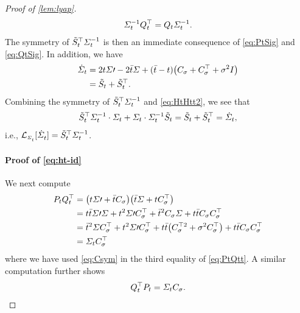 \begin{proof}[Proof of \cref{lem:lyap}]
\begin{align}
\label{eq:QtSig}
\Sigma^{-1}_{t}Q_{t}^\top = Q_{t} \Sigma^{-1}_{t}.
\end{align}The symmetry of $\tilde{S}_{t}^\top\Sigma^{-1}_{t}$ is then an immediate consequence of \eqref{eq:PtSig} and \eqref{eq:QtSig}. In addition, we have
\begin{align}
\nn
\dSigcurve &= 2\ctime\Sigma\prime - 2 \ctimebar\Sigma + (\ctimebar-\ctime)\parens*{   \C +\C^\top  + \sdev^2\eye } \\
\label{eq:HtHtt2}
&=  \Ht + \Ht^\top.
\end{align}
Combining the symmetry of $\tilde{S}_{t}^\top\Sigma^{-1}_{t}$ and \eqref{eq:HtHtt2}, we see that
\begin{align}
\nonumber
\tilde{S}_{t}^\top\Sigma^{-1}_{t} \cdot \Sigma_{t} + \Sigma_{t} \cdot \Sigma^{-1}_{t} \tilde{S}_{t} = \tilde{S}_{t}+\tilde{S}_{t}^\top = \dot{\Sigma}_{t},
\end{align}
i.e., $\lyap = \Ht^\top\Sigcurveinv$.



\paragraph{Proof of \eqref{eq:ht-id}}

We next compute
\begin{align}
\nn
\Pt \Qt^\top &= \parens*{\ctime \Sigma\prime + \ctimebar \C}\parens*{\ctimebar \Sigma + \ctime \C^\top} \\
\nn
&= \ctime\ctimebar\Sigma\prime\Sigma + \ctime^2\Sigma\prime\C^\top + \ctimebar^2\C\Sigma + \ctime\ctimebar\C\C^\top \\
\nn
&= \ctimebar^2\Sigma \C^\top + \ctime^2\Sigma\prime\C^\top+ \ctime\ctimebar \parens*{ \C^{\top 2}+ \sdev^2\C^\top }+ \ctime\ctimebar  \C\C^\top
\\
\label{eq:PtQtt}
&= \Sigcurve\C^\top
\end{align}
where we have used \eqref{eq:Csym} in the third equality of \eqref{eq:PtQtt}. A similar computation further shows 
\begin{align}
\label{eq:QttPt}
Q_{t}^\top P_{t} = \Sigma_{t}C_{\sigma}.
\end{align}


\end{proof}
